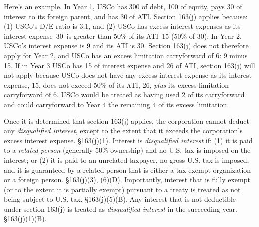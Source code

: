 Here's an example.  In Year 1, USCo has 300 of debt, 100 of equity, pays 30 of interest to its foreign parent, and has 30 of ATI.  Section 163(j) applies because: (1) USCo's D/E ratio is 3:1, and (2) USCo has excess interest expenses as its interest expense--30--is greater than 50\% of its ATI--15 (50\% of 30).  In Year 2, USCo's interest expense is 9 and its ATI is 30.   Section 163(j) does not therefore apply for Year 2, and USCo has an excess limitation carryforward of 6:  9 minus 15.  If in Year 3 USCo has 15 of interest expense and 26 of ATI, section 163(j) will not apply because USCo does not have any excess interest expense as its interest expense, 15, does not exceed  50\% of its ATI, 26, \emph{plus} its excess limitation carryforward of 6.  USCo would be treated as having used 2 of its carryforward and could carryforward to Year 4 the remaining 4 of its excess limitation.  

Once it is determined that section 163(j) applies, the corporation cannot deduct any \emph{disqualified interest}, except to the extent that it exceeds the corporation's excess interest expense.  \S163(j)(1).  Interest is \emph{disqualified interest} if:  (1) it is paid to a \emph{related person} (generally 50\% ownership) and no U.S. tax is imposed on the interest; or (2) it is paid to an unrelated taxpayer, no gross U.S. tax is imposed, and it is guaranteed by a related person that is either a tax-exempt organization or a foreign person.  \S163(j)(3), (6)(D).  Importantly, interest that is fully exempt (or to the extent it is partially exempt) pursuant to a treaty is treated as not being subject to U.S. tax.  \S163(j)(5)(B).  Any interest that is not deductible under section 163(j) is treated as \emph{disqualified interest} in the succeeding year.  \S163(j)(1)(B).
     
